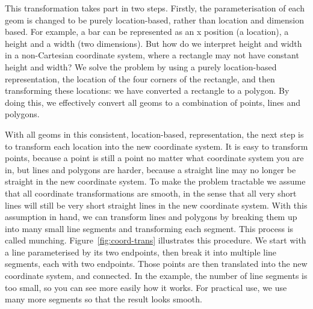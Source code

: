 This transformation takes part in two steps. Firstly, the parameterisation of each geom is changed to be purely location-based, rather than location and dimension based. For example, a bar can be represented as an x position (a location), a height and a width (two dimensions). But how do we interpret height and width in a non-Cartesian coordinate system, where a rectangle may not have constant height and width? We solve the problem by using a purely location-based representation, the location of the four corners of the rectangle, and then transforming these locations: we have converted a rectangle to a polygon. By doing this, we effectively convert all geoms to a combination of points, lines and polygons.

With all geoms in this consistent, location-based, representation, the next step is to transform each location into the new coordinate system. It is easy to transform points, because a point is still a point no matter what coordinate system you are in, but lines and polygons are harder, because a straight line may no longer be straight in the new coordinate system. To make the problem tractable we assume that all coordinate transformations are smooth, in the sense that all very short lines will still be very short straight lines in the new coordinate system. With this assumption in hand, we can transform lines and polygons by breaking them up into many small line segments and transforming each segment. This process is called munching. Figure~\ref{fig:coord-trans} illustrates this procedure. We start with a line parameterised by its two endpoints, then break it into multiple line segments, each with two endpoints. Those points are then translated into the new coordinate system, and connected. In the example, the number of line segments is too small, so you can see more easily how it works. For practical use, we use many more segments so that the result looks smooth.

% 
%
% 


